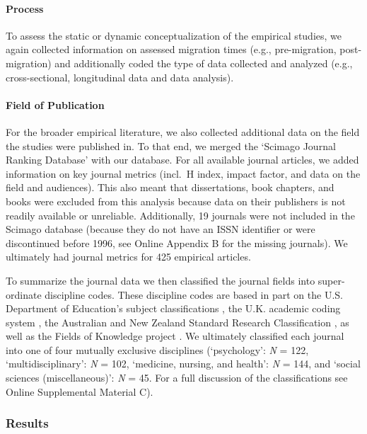 \paragraph{Process}

To assess the static or dynamic conceptualization of the empirical
studies, we again collected information on assessed migration times
(e.g., pre-migration, post-migration) and additionally coded the type of
data collected and analyzed (e.g., cross-sectional, longitudinal data
and data analysis).

\paragraph{Field of Publication}

For the broader empirical literature, we also collected additional data
on the field the studies were published in. To that end, we merged the
`Scimago Journal Ranking Database' \citep{SCImago2020} with our
database. For all available journal articles, we added information on
key journal metrics (incl.~H index, impact factor, and data on the field
and audiences). This also meant that dissertations, book chapters, and
books were excluded from this analysis because data on their publishers
is not readily available or unreliable. Additionally, 19 journals were
not included in the Scimago database (because they do not have an ISSN
identifier or were discontinued before 1996, see Online Appendix B for
the missing journals). We ultimately had journal metrics for 425
empirical articles.

To summarize the journal data we then classified the journal fields into
super-ordinate discipline codes. These discipline codes are based in
part on the U.S. Department of Education's subject classifications
\citep[i.e., CIP,][]{InstituteofEducationSciences2020}, the U.K.
academic coding system
\citep[JACS 3.0,][]{HigherEducationStatisticsAgency2013}, the Australian
and New Zealand Standard Research Classification
\citep[ANZSRC 2020,][]{AustralianBureauofStatistics2020}, as well as the
Fields of Knowledge project \citep{ThingsmadeThinkable2014}. We
ultimately classified each journal into one of four mutually exclusive
disciplines (`psychology': \textit{N} = 122, `multidisciplinary':
\textit{N} = 102, `medicine, nursing, and health': \textit{N} = 144, and
`social sciences (miscellaneous)': \textit{N} = 45. For a full
discussion of the classifications see Online Supplemental Material C).

\subsubsection{Results}

